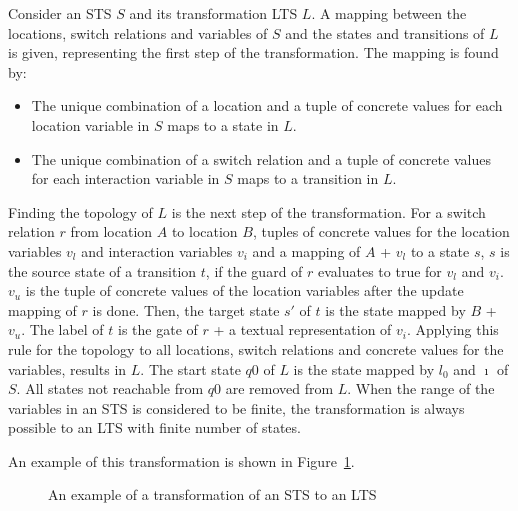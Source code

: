 Consider an STS $S$ and its transformation LTS $L$. A mapping between the locations, switch relations and variables of $S$ and the states and transitions of $L$ is given, representing the first step of the transformation. The mapping is found by:
\begin{itemize}
  \item The unique combination of a location and a tuple of concrete values for each location variable in $S$ maps to a state in $L$. 
  \item The unique combination of a switch relation and a tuple of concrete values for each interaction variable in $S$ maps to a transition in $L$.
\end{itemize}
Finding the topology of $L$ is the next step of the transformation. For a switch relation $r$ from location $A$ to location $B$, tuples of concrete values for the location variables $v_l$ and interaction variables $v_i$ and a mapping of $A$ + $v_l$ to a state $s$, $s$ is the source state of a transition $t$, if the guard of $r$ evaluates to true for $v_l$ and $v_i$. $v_u$ is the tuple of concrete values of the location variables after the update mapping of $r$ is done. Then, the target state $s'$ of $t$ is the state mapped by $B$ + $v_u$. The label of $t$ is the gate of $r$ + a textual representation of $v_i$. Applying this rule for the topology to all locations, switch relations and concrete values for the variables, results in $L$. The start state $q0$ of $L$ is the state mapped by $l_0$ and $\imath$ of $S$. All states not reachable from $q0$ are removed from $L$. When the range of the variables in an STS is considered to be finite, the transformation is always possible to an LTS with finite number of states.

An example of this transformation is shown in Figure~\ref{fig:example_trafo}. 

\begin{figure}[h]
  \begin{center}
    \hspace{20px}
  \end{center}
  \caption{An example of a transformation of an STS to an LTS}
  \label{fig:example_trafo}
\end{figure}

